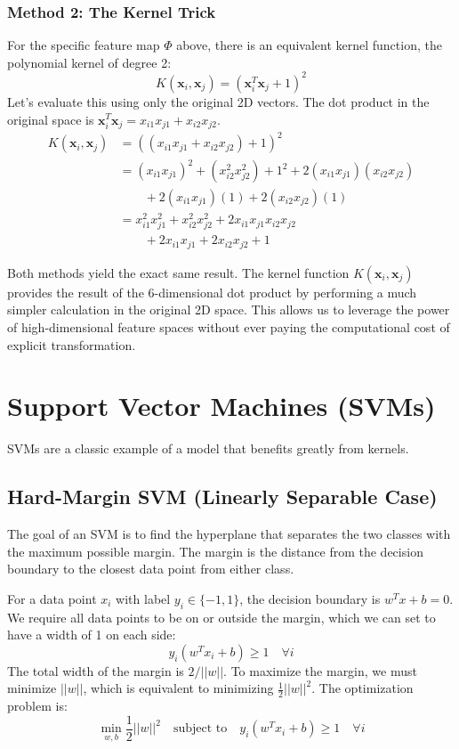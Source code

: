 \documentclass{article}
\begin{document}
\begin{multicols}{2}
	\subsubsection{Method 2: The Kernel Trick}
	For the specific feature map $\Phi$ above, there is an equivalent kernel function, the polynomial kernel of degree 2:
	$$K(\mathbf{x}_i, \mathbf{x}_j) = (\mathbf{x}_i^T \mathbf{x}_j + 1)^2$$
	Let's evaluate this using only the original 2D vectors. The dot product in the original space is $\mathbf{x}_i^T \mathbf{x}_j = x_{i1}x_{j1} + x_{i2}x_{j2}$.
	\begin{align*}
		K(\mathbf{x}_i, \mathbf{x}_j)
		 & = ((x_{i1}x_{j1} + x_{i2}x_{j2}) + 1)^2                                       \\
		 & = (x_{i1}x_{j1})^2 + (x_{i2}^2x_{j2}^2) + 1^2 + 2(x_{i1}x_{j1})(x_{i2}x_{j2}) \\
		 & \qquad + 2(x_{i1}x_{j1})(1) + 2(x_{i2}x_{j2})(1)                              \\
		 & = x_{i1}^2x_{j1}^2 + x_{i2}^2x_{j2}^2 + 2x_{i1}x_{j1}x_{i2}x_{j2}             \\
		 & \qquad + 2x_{i1}x_{j1} + 2x_{i2}x_{j2} + 1
	\end{align*}

	Both methods yield the exact same result. The kernel function $K(\mathbf{x}_i, \mathbf{x}_j)$ provides the result of the 6-dimensional dot product by performing a much simpler calculation in the original 2D space. This allows us to leverage the power of high-dimensional feature spaces without ever paying the computational cost of explicit transformation.

	\section{Support Vector Machines (SVMs)}
	SVMs are a classic example of a model that benefits greatly from kernels.

	\subsection{Hard-Margin SVM (Linearly Separable Case)}
	The goal of an SVM is to find the hyperplane that separates the two classes with the maximum possible margin. The margin is the distance from the decision boundary to the closest data point from either class.

	For a data point $x_i$ with label $y_i \in \{-1, 1\}$, the decision boundary is $w^T x + b = 0$. We require all data points to be on or outside the margin, which we can set to have a width of 1 on each side:
	$$ y_i(w^T x_i + b) \ge 1 \quad \forall i $$
	The total width of the margin is $2/||w||$. To maximize the margin, we must minimize $||w||$, which is equivalent to minimizing $\frac{1}{2}||w||^2$. The optimization problem is:
	$$ \min_{w, b} \frac{1}{2}||w||^2 \quad \text{subject to} \quad y_i(w^T x_i + b) \ge 1 \quad \forall i $$


\end{multicols}
\end{document}
